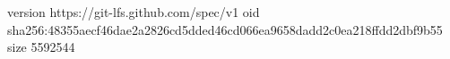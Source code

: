 version https://git-lfs.github.com/spec/v1
oid sha256:48355aecf46dae2a2826cd5dded46cd066ea9658dadd2c0ea218ffdd2dbf9b55
size 5592544
